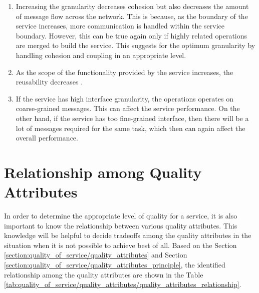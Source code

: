 {{{{{{{{{\begin{enumerate}
\item Increasing the granularity decreases cohesion but also decreases the amount of message flow across the network. This is because, as the boundary of the service increases, more communication is handled within the service boundary. However, this can be true again only if highly related operations are merged to build the service. This suggests for the optimum granularity by handling cohesion and coupling in an appropriate level.\cite{Ma:2009aa, Bianco:2007aa}

\item As the scope of the functionality provided by the service increases, the reusability decreases \cite{Feuerlicht:2007aa}.

\item If the service has high interface granularity, the operations operates on coarse-grained messages. This can affect the service performance. On the other hand, if the service has too fine-grained interface, then there will be a lot of messages required for the same task, which then can again affect the overall performance. \cite{Bianco:2007aa}


\end{enumerate}


\section{Relationship among Quality Attributes}{\label{section:quality_of_service/quality_attributes_relationship}
In order to determine the appropriate level of quality for a service, it is also important to know the relationship between various quality attributes. This knowledge will be helpful to decide tradeoffs among the quality attributes in the situation when it is not possible to achieve best of all. Based on the Section \ref{section:quality_of_service/quality_attributes} and Section \ref{section:quality_of_service/quality_attributes_principle}, the identified relationship among the quality attributes are shown in the Table \ref{tab:quality_of_service/quality_attributes/quality_attributes_relationship}.

}}}}}}}}}}
